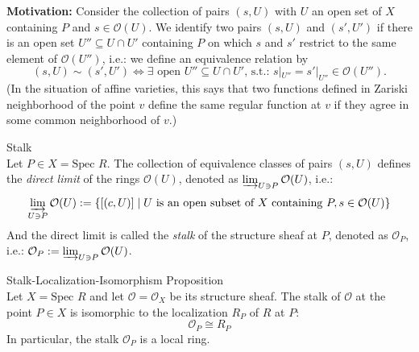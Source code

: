 \noindent\textbf{Motivation:} Consider the collection of pairs $(s,U)$ with $U$ an open set of $X$ containing $P$ and $s \in \mathcal{O} (U)$. We identify two pairs $(s,U)$ and $(s',U')$ if there is an open set $U'' \subseteq U\cap U'$ containing $P$ on which $s$ and $s'$ restrict to the same element of $\mathcal{O} (U'')$, i.e.: we define an equivalence relation by
\[
(s,U) \sim (s',U') \Leftrightarrow \exists \text{ open } U''\subseteq U \cap U' \text{, s.t.: } s|_{U''}=s'|_{U''} \in \mathcal{O} (U'').
\]
(In the situation of affine varieties, this says that two functions defined in Zariski neighborhood of the point $v$ define the same regular function at $v$ if they agree in some common neighborhood of $v$.)

\begin{definition}{Stalk}\\
Let $P \in X=\text{Spec }R$. The collection of equivalence classes of pairs $(s,U)$ defines the \textit{direct limit} of the rings $\mathcal{O} (U)$, denoted as $\varinjlim_{U \ni P} \mathcal{O}(U)$, i.e.:
\[
\varinjlim_{U \ni P} \mathcal{O}(U) := \{ [(c,U)] \mid U \text{ is an open subset of }X \text{ containing } P,s\in \mathcal{O} (U) \}
\]
And the direct limit is called the \textit{stalk} of the structure sheaf at $P$, denoted as $\mathcal{O}_P$, i.e.: $\mathcal{O}_P := \varinjlim_{U \ni P} \mathcal{O}(U)$.
\end{definition}

\begin{proposition}{Stalk-Localization-Isomorphism Proposition}\\
Let $X=\text{Spec }R$ and let $\mathcal{O}=\mathcal{O}_X$ be its structure sheaf. The stalk of $\mathcal{O}$ at the point $P\in X$ is isomorphic to the localization $R_P$ of $R$ at $P$:
\[
\mathcal{O}_P \cong R_P
\]
In particular, the stalk $\mathcal{O}_P$ is a local ring.
\end{proposition}

